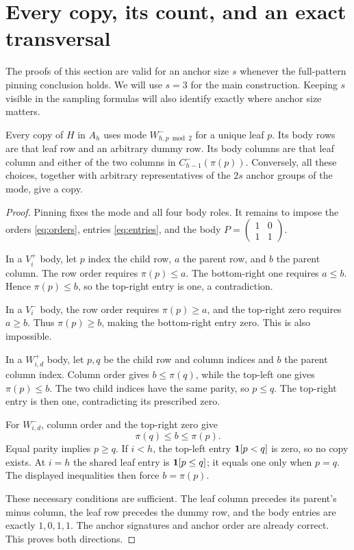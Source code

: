 \section{Every copy, its count, and an exact transversal}
\label{sec:copies}

The proofs of this section are valid for an anchor size \(s\) whenever
the full-pattern pinning conclusion holds. We will use \(s=3\) for the
main construction. Keeping \(s\) visible in the sampling formulas will
also identify exactly where anchor size matters.

\begin{theorem}
\label{thm:classification}
Every copy of \(H\) in \(A_h\) uses mode \(W_{h,p\bmod2}^-\) for a
unique leaf \(p\). Its body rows are that leaf row and an arbitrary
dummy row. Its body columns are that leaf column and either of the two
columns in \(C_{h-1}^-(\pi(p))\). Conversely, all these choices, together
with arbitrary representatives of the \(2s\) anchor groups of the mode,
give a copy.
\end{theorem}
\begin{proof}
Pinning fixes the mode and all four body roles. It remains to impose
the orders \eqref{eq:orders}, entries \eqref{eq:entries}, and the body
\(P=\left(\begin{smallmatrix}1&0\\1&1\end{smallmatrix}\right)\).

In a \(V_i^+\) body, let \(p\) index the child row, \(a\) the parent
row, and \(b\) the parent column. The row order requires \(\pi(p)\le a\).
The bottom-right one requires \(a\le b\). Hence \(\pi(p)\le b\), so
the top-right entry is one, a contradiction.

In a \(V_i^-\) body, the row order requires \(\pi(p)\ge a\), and
the top-right zero requires \(a\ge b\). Thus \(\pi(p)\ge b\), making
the bottom-right entry zero. This is also impossible.

In a \(W_{i,d}^+\) body, let \(p,q\) be the child row and column
indices and \(b\) the parent column index. Column order gives
\(b\le\pi(q)\), while the top-left one gives \(\pi(p)\le b\).
The two child indices have the same parity, so \(p\le q\). The
top-right entry is then one, contradicting its prescribed zero.

For \(W_{i,d}^-\), column order and the top-right zero give
\[
 \pi(q)\le b\le\pi(p).
\]
Equal parity implies \(p\ge q\). If \(i<h\), the top-left entry
\(\mathbf 1[p<q]\) is zero, so no copy exists. At \(i=h\) the shared
leaf entry is \(\mathbf 1[p\le q]\); it equals one only when \(p=q\).
The displayed inequalities then force \(b=\pi(p)\).

These necessary conditions are sufficient. The leaf column precedes
its parent's minus column, the leaf row precedes the dummy row, and
the body entries are exactly \(1,0,1,1\). The anchor signatures and
anchor order are already correct. This proves both directions.
\end{proof}

